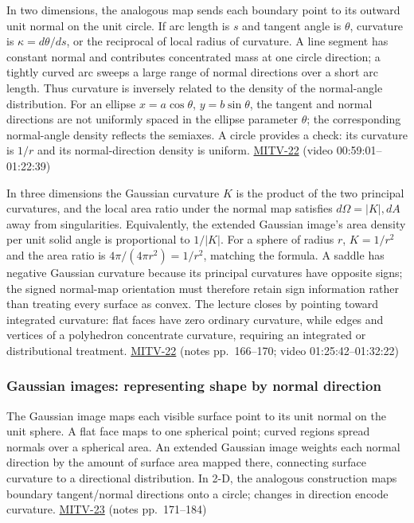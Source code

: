 In two dimensions, the analogous map sends each boundary point to its outward unit normal on the unit circle. If arc length is \(s\) and tangent angle is \(\theta\), curvature is \(\kappa=d\theta/ds\), or the reciprocal of local radius of curvature. A line segment has constant normal and contributes concentrated mass at one circle direction; a tightly curved arc sweeps a large range of normal directions over a short arc length. Thus curvature is inversely related to the density of the normal-angle distribution. For an ellipse \(x=a\cos\theta\), \(y=b\sin\theta\), the tangent and normal directions are not uniformly spaced in the ellipse parameter \(\theta\); the corresponding normal-angle density reflects the semiaxes. A circle provides a check: its curvature is \(1/r\) and its normal-direction density is uniform. \hyperref[04-visual-computing-ii-ch036]{MITV-22} (video 00:59:01--01:22:39)

In three dimensions the Gaussian curvature \(K\) is the product of the two principal curvatures, and the local area ratio under the normal map satisfies \(d\Omega=|K|,dA\) away from singularities. Equivalently, the extended Gaussian image's area density per unit solid angle is proportional to \(1/|K|\). For a sphere of radius \(r\), \(K=1/r^2\) and the area ratio is \(4\pi/(4\pi r^2)=1/r^2\), matching the formula. A saddle has negative Gaussian curvature because its principal curvatures have opposite signs; the signed normal-map orientation must therefore retain sign information rather than treating every surface as convex. The lecture closes by pointing toward integrated curvature: flat faces have zero ordinary curvature, while edges and vertices of a polyhedron concentrate curvature, requiring an integrated or distributional treatment. \hyperref[04-visual-computing-ii-ch036]{MITV-22} (notes pp.~166--170; video 01:25:42--01:32:22)

\subsubsection{Gaussian images: representing shape by normal direction}\label{gaussian-images-representing-shape-by-normal-direction}

The Gaussian image maps each visible surface point to its unit normal on the unit sphere. A flat face maps to one spherical point; curved regions spread normals over a spherical area. An extended Gaussian image weights each normal direction by the amount of surface area mapped there, connecting surface curvature to a directional distribution. In 2-D, the analogous construction maps boundary tangent/normal directions onto a circle; changes in direction encode curvature. \hyperref[04-visual-computing-ii-ch036]{MITV-23} (notes pp.~171--184)

